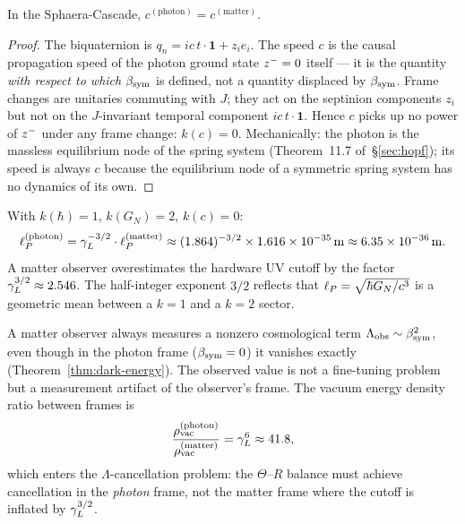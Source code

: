 \begin{theorem}[$k(c)=0$: the speed of light is frame-invariant]
\label{thm:kc-zero}
In the Sphaera-Cascade, $c^{(\mathrm{photon})}=c^{(\mathrm{matter})}$.
\end{theorem}

\begin{proof}
The biquaternion is $q_n = ic\,t\cdot\mathbf{1}+z_i e_i$.
The speed $c$ is the causal propagation speed of the photon ground state
$z^-=0$ itself --- it is the quantity \emph{with respect to which}
$\beta_{\mathrm{sym}}$ is defined, not a quantity displaced by $\beta_{\mathrm{sym}}$.
Frame changes are unitaries commuting with $J$; they act on the septinion
components $z_i$ but not on the $J$-invariant temporal component
$ic\,t\cdot\mathbf{1}$.
Hence $c$ picks up no power of $z^-$ under any frame change:
$k(c)=0$.
Mechanically: the photon is the massless equilibrium node of the
spring system (Theorem~11.7 of~\S\ref{sec:hopf}); its speed is always $c$ because
the equilibrium node of a symmetric spring system has no dynamics of its own.
\end{proof}

\begin{theorem}\label{thm:planck-photon}
With $k(\hbar)=1$, $k(G_N)=2$, $k(c)=0$:
\[
  \ell_P^{(\mathrm{photon})}
  = \gamma_L^{-3/2}\cdot\ell_P^{(\mathrm{matter})}
  \approx (1.864)^{-3/2}\times 1.616\times10^{-35}\,\mathrm{m}
  \approx 6.35\times10^{-36}\,\mathrm{m}.
\]
A matter observer overestimates the hardware UV cutoff by the factor
$\gamma_L^{3/2}\approx 2.546$.
The half-integer exponent $3/2$ reflects that $\ell_P=\sqrt{\hbar G_N/c^3}$
is a geometric mean between a $k=1$ and a $k=2$ sector.
\end{theorem}

\begin{corollary}
A matter observer always measures a nonzero cosmological term
$\Lambda_{\mathrm{obs}}\sim\beta_{\mathrm{sym}}^2$, even though in the photon frame
($\beta_{\mathrm{sym}}=0$) it vanishes exactly
(Theorem~\ref{thm:dark-energy}).
The observed value is not a fine-tuning problem but a measurement
artifact of the observer's frame.
The vacuum energy density ratio between frames is
\[
  \frac{\rho_{\mathrm{vac}}^{(\mathrm{photon})}}
       {\rho_{\mathrm{vac}}^{(\mathrm{matter})}}
  = \gamma_L^6\approx 41.8,
\]
which enters the $\Lambda$-cancellation problem: the $\Theta$--$R$
balance must achieve cancellation in the \emph{photon} frame, not the
matter frame where the cutoff is inflated by $\gamma_L^{3/2}$.
\end{corollary}


